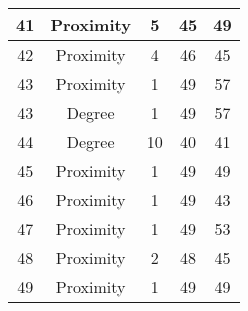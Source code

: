 \documentclass[results.tex]{subfiles}
\begin{document}
\begin{center}
\begin{tabular}{| c || c | c | c | c |}
            \hline
            41                      & Proximity                    & 5                      & 45                      & 49                   \\
            \hline
            42                      & Proximity                    & 4                      & 46                      & 45                   \\
            \hline
            43                      & Proximity                    & 1                      & 49                      & 57                   \\
            \hline
            43                      & Degree                       & 1                      & 49                      & 57                   \\
            \hline
            44                      & Degree                       & 10                     & 40                      & 41                   \\
            \hline
            45                      & Proximity                    & 1                      & 49                      & 49                   \\
            \hline
            46                      & Proximity                    & 1                      & 49                      & 43                   \\
            \hline
            47                      & Proximity                    & 1                      & 49                      & 53                   \\
            \hline
            48                      & Proximity                    & 2                      & 48                      & 45                   \\
            \hline
            49                      & Proximity                    & 1                      & 49                      & 49                   \\
            \hline
        \end{tabular}
    \end{center}
\end{document}

